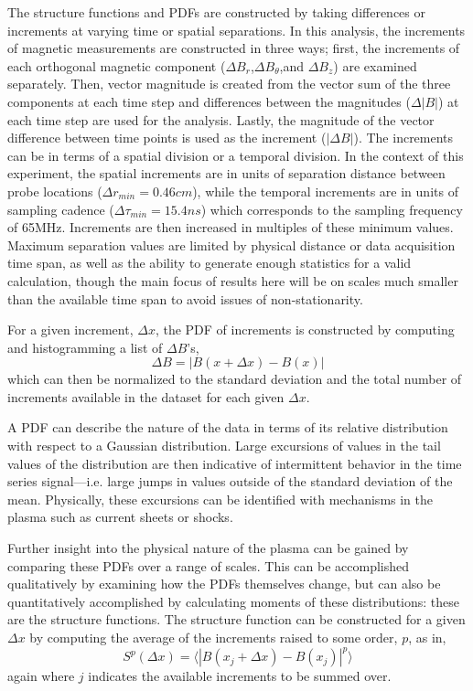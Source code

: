 \documentclass[preprint2]{aastex}
\begin{document}
The structure functions and PDFs are constructed by taking differences or increments at varying time or spatial separations. In this analysis, the increments of magnetic measurements are constructed in three ways; first, the increments of each orthogonal magnetic component ($\Delta B_r$,$\Delta B_{\theta}$,and $\Delta B_z$) are examined separately. Then, vector magnitude is created from the vector sum of the three components at each time step and differences between the magnitudes ($\Delta |B|$) at each time step are used for the analysis. Lastly, the magnitude of the vector difference between time points is used as the increment ($|\Delta B|$). The increments can be in terms of a spatial division or a temporal division. In the context of this experiment, the spatial increments are in units of separation distance between probe locations ($\Delta r_{min} = 0.46cm$), while the temporal increments are in units of sampling cadence ($\Delta \tau_{min} = 15.4ns$) which corresponds to the sampling frequency of 65MHz. Increments are then increased in multiples of these minimum values. Maximum separation values are limited by physical distance or data acquisition time span, as well as the ability to generate enough statistics for a valid calculation, though the main focus of results here will be on scales much smaller than the available time span to avoid issues of non-stationarity.

For a given increment, $\Delta x$, the PDF of increments is constructed by computing and histogramming a list of $\Delta B$'s,
\begin{equation}
\Delta B = |B(x+\Delta x)-B(x)|
\label{eq:increment}
\end{equation}
which can then be normalized to the standard deviation and the total number of increments available in the dataset for each given $\Delta x$.

A  PDF can describe the nature of the data in terms of its relative distribution with respect to a Gaussian distribution. Large excursions of values in the tail values of the distribution are then indicative of intermittent behavior in the time series signal---i.e. large jumps in values outside of the standard deviation of the mean. Physically, these excursions can be identified with mechanisms in the plasma such as current sheets or shocks.

Further insight into the physical nature of the plasma can be gained by comparing these PDFs over a range of scales. This can be accomplished qualitatively by examining how the PDFs themselves change, but can also be quantitatively accomplished by calculating moments of these distributions: these are the structure functions. The structure function can be constructed for a given $\Delta x$ by computing the average of the increments raised to some order, $p$, as in,
\begin{equation}
S^{p}(\Delta x) = \langle|B(x_{j}+\Delta x)-B(x_{j})|^{p}\rangle
\label{eq:structfunc}
\end{equation}
again where $j$ indicates the available increments to be summed over. 
\end{document}

